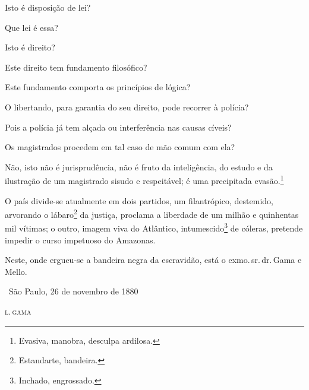 {Isto é disposição de lei?

Que lei é essa?

Isto é direito?

Este direito tem fundamento filosófico?

Este fundamento comporta os princípios de lógica?

O libertando, para garantia do seu direito, pode recorrer à polícia?

Pois a polícia já tem alçada ou interferência nas causas cíveis?

Os magistrados procedem em tal caso de mão comum com ela?

Não, isto não é jurisprudência, não é fruto da inteligência, do estudo e
da ilustração de um magistrado sisudo e respeitável; é uma precipitada
evasão.\footnote{Evasiva, manobra, desculpa ardilosa.}

O país divide-se atualmente em dois partidos, um filantrópico,
destemido, arvorando o lábaro\footnote{Estandarte, bandeira.} da
justiça, proclama a liberdade de um milhão e quinhentas mil vítimas; o
outro, imagem viva do Atlântico, intumescido\footnote{Inchado,
  engrossado.} de cóleras,
pretende impedir o curso impetuoso do Amazonas.

Neste, onde ergueu-se a bandeira negra da escravidão, está o exmo.\,sr.\,dr.\,Gama e Mello.

\medskip

\hfill\ São Paulo, 26 de novembro de 1880

\hfill\textsc{l.\,gama}


}

